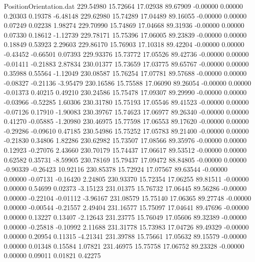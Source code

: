 \begin{filecontents}{PositionOrientation.dat}
 229.54980   15.72664   17.02938    89.67909   -0.00000    0.00000    0.20303    0.19378   -6.48148
 229.62980   15.74289   17.04489    89.16055   -0.00000    0.00000    0.07249    0.02238    1.98274
 229.70990   15.74869   17.04668    89.31936   -0.00000    0.00000    0.07330    0.18612   -1.12739
 229.78171   15.75396   17.06005    89.23839   -0.00000    0.00000    0.18849    0.53923    2.29603
 229.86170   15.76903   17.10318    89.42204   -0.00000    0.00000   -0.43452   -0.66501    0.07393
 229.93376   15.73772   17.05526    89.42736   -0.00000    0.00000   -0.01411   -0.21883    2.87834
 230.01377   15.73659   17.03775    89.65767   -0.00000    0.00000    0.35988    0.55564   -1.12049
 230.08587   15.76254   17.07781    89.57688   -0.00000    0.00000   -0.08327   -0.21136   -3.95479
 230.16586   15.75588   17.06090    89.26054   -0.00000    0.00000   -0.01373    0.40215    0.49210
 230.24586   15.75478   17.09307    89.29990   -0.00000    0.00000   -0.03966   -0.52285    1.60306
 230.31780   15.75193   17.05546    89.41523   -0.00000    0.00000   -0.07126    0.17910   -1.90083
 230.39767   15.74623   17.06977    89.26340   -0.00000    0.00000    0.41270   -0.05885   -1.20980
 230.46975   15.77598   17.06553    89.17620   -0.00000    0.00000   -0.29286   -0.09610    0.47185
 230.54986   15.75252   17.05783    89.21400   -0.00000    0.00000   -0.21830    0.34806    1.82286
 230.62982   15.73507   17.08566    89.35976   -0.00000    0.00000    0.12923   -0.27076    2.43660
 230.70179   15.74437   17.06617    89.53512   -0.00000    0.00000    0.62582    0.35731   -8.59905
 230.78169   15.79437   17.09472    88.84805   -0.00000    0.00000   -0.90339   -0.26423   10.92116
 230.85378   15.72924   17.07567    89.63544   -0.00000    0.00000   -0.07131   -0.16420    2.24805
 230.93370   15.72354   17.06255    89.81511   -0.00000    0.00000    0.54699    0.02373   -3.15123
 231.01375   15.76732   17.06445    89.56286   -0.00000    0.00000   -0.22104   -0.01112   -3.96167
 231.08579   15.75140   17.06365    89.27748   -0.00000    0.00000   -0.00544   -0.21557    2.49404
 231.16577   15.75097   17.04641    89.47696   -0.00000    0.00000    0.13227    0.13407   -2.12643
 231.23775   15.76049   17.05606    89.32389   -0.00000    0.00000   -0.25818   -0.10992    2.11688
 231.31778   15.73983   17.04726    89.49329   -0.00000    0.00000    0.20954    0.11315   -4.21341
 231.39788   15.75661   17.05632    89.15579   -0.00000    0.00000    0.01348    0.15584    1.07821
 231.46975   15.75758   17.06752    89.23328   -0.00000    0.00000    0.09011    0.01821    0.42275

\end{filecontents}

